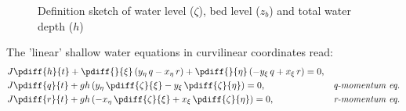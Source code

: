 \vspace{1cm}
\begin{figure}[H]
    \centering
    \begin{center}
        \def\svgwidth{1.0\textwidth} %
        \resizebox{0.9\textwidth}{!}{
            
        }
    \end{center}
    \caption{Definition sketch of water level ($\zeta$), bed level ($z_b$) and total water depth ($h$)}\label{fig:definition_variables_2d}
\end{figure}
The 'linear' shallow water equations in curvilinear coordinates read:
\begin{align}
    &J \pdiff{h}{t} +\pdiff{}{\xi} \left( y_{\eta}\, q - x_{\eta}\, r \right) + \pdiff{}{\eta} \left( -y_{\xi}\, q + x_{\xi}\, r \right) = 0,
    \label{eq:continuity_curvi}
    \\*
    &J \pdiff{q}{t} + g h \left( y_{\eta}\, \pdiff{\zeta}{\xi} - y_{\xi}\, \pdiff{\zeta}{\eta} \right) = 0, & \textit{q-momentum eq.}
    \label{eq:xi_momentum_curvi}
    \\*
    &J \pdiff{r}{t} + g h \left( -x_{\eta}\, \pdiff{\zeta}{\xi} + x_{\xi}\, \pdiff{\zeta}{\eta} \right) = 0, & \textit{r-momentum eq.}
    \label{eq:eta_momentum_curvi}
\end{align}
